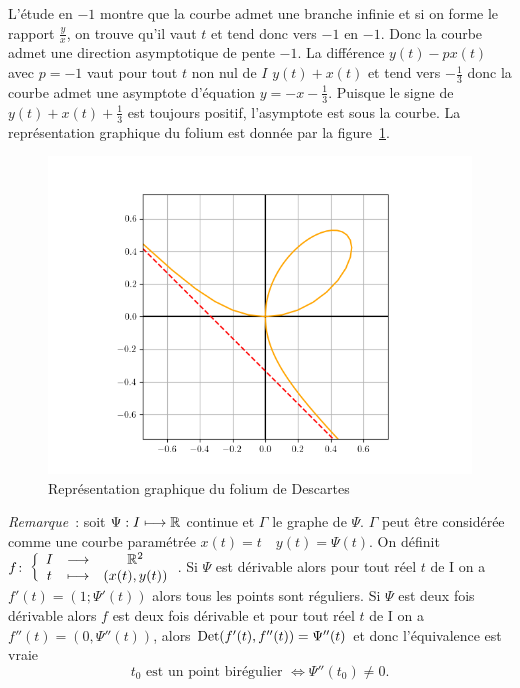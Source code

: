 L'étude en \(-1\) montre que la courbe admet une branche infinie et si on forme le rapport \(\frac{y}{x}\), on trouve qu'il vaut \(t\) et tend donc vers \(-1\) en \(-1\). Donc la courbe admet une direction asymptotique de pente \(-1\). La différence \(y(t)-px(t)\) avec \(p=-1\) vaut pour tout \(t\) non nul de \(I\) \(y(t)+x(t)\) et tend vers \(-\frac{1}{3}\) donc la courbe admet une asymptote d'équation \(y=-x-\frac{1}{3}\). Puisque le signe de \(y(t)+x(t)+\frac{1}{3}\) est toujours positif, l'asymptote est sous la courbe. La représentation graphique du folium est donnée par la figure~\ref{fig:folium}.
\begin{figure}
 \centering
 \includegraphics[scale=0.7]{folium.png}
 \caption{Représentation graphique du folium de Descartes}
 \label{fig:folium}
\end{figure}

\emph{Remarque}~:
soit \(\Psi : I \longmapsto \mathbb{R}\) continue et \(\Gamma\) le graphe de \(\Psi\). \(\Gamma\) peut être considérée comme une courbe paramétrée \(x(t)=t \quad y(t)=\Psi(t)\). On définit \(f\colon \left\{\begin{array}{ccc} I & \longrightarrow &\mathbb{R}^2\\ t & \longmapsto & (x(t),y(t)) \end{array} \right.\). Si \(\Psi\) est dérivable alors pour tout réel \(t\) de I on a \(f'(t)=(1;\Psi'(t))\) alors tous les points sont réguliers. Si \(\Psi\) est deux fois dérivable alors \(f\) est deux fois dérivable et pour tout réel \(t\) de I on a \(f''(t)=(0,\Psi''(t))\), alors \(\operatorname{Det}(f'(t),f''(t))=\Psi''(t)\) et donc l'équivalence est vraie
\begin{equation}
 t_0 \text{~est un point birégulier } \iff \Psi''(t_0) \neq 0.
\end{equation}

